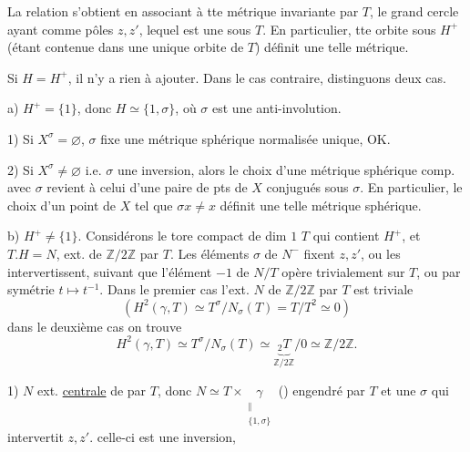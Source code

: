 La relation s'obtient en associant à tte métrique invariante par $T$, le  grand cercle ayant comme pôles $z,z'$, lequel est une  sous $T$. En particulier, tte orbite sous $H^+$ (étant contenue dans une unique orbite de $T$) définit une telle métrique.

Si $H=H^+$, il n'y a  rien à ajouter. Dans le
cas contraire, distinguons deux cas.

a) $H^+=\{1\}$, donc $H\simeq\{1,\sigma\}$, où $\sigma$ est une anti-involution.

1) Si \deleted{\unsure{$\sigma$}} $X^\sigma=\varnothing$, $\sigma$ fixe une métrique sphérique normalisée unique, OK.

2) Si $X^\sigma\ne\varnothing$ i.e. $\sigma$ une inversion, alors le choix d'une métrique sphérique comp. avec $\sigma$ revient à celui d'une paire de pts de $X$ conjugués sous $\sigma$. En particulier, le choix d'un point de $X$ tel que $\sigma x\ne x$ définit une telle métrique sphérique.

b) $H^+\ne\{1\}$. Considérons le tore  compact de dim $1$ $T$ qui contient $H^+$, et $T.H=N$, ext. de  $\mathbb Z/2\mathbb Z$ par $T$. Les éléments  $\sigma$ de $N^-$ fixent $z,z'$, ou les intervertissent, suivant que l'élément $-1$ de $N/T$ opère trivialement sur $T$, ou par symétrie $t\longmapsto t^{-1}$.
Dans le premier cas l'ext. $N$ de\inserted{$\gamma=$} $\mathbb Z/2\mathbb Z$ par $T$ est triviale
\[
\left(H^2(\gamma,T)\simeq T^\sigma/N_\sigma(T)=T/T^2\simeq0\right)
\]
dans le deuxième cas on trouve
\[
H^2(\gamma,T)\simeq T^\sigma/N_\sigma(T)\simeq\underbrace{{}_2T}_{\mathbb Z/2\mathbb Z}/0\simeq\mathbb Z/2\mathbb Z.
\]

1) $N$ ext. \uline{centrale} de \inserted{$\gamma$} par $T$, donc $N\simeq T\times\underset{\substack{\Vert\\\{1,\sigma\}}}{\gamma}$ () engendré par $T$ et une $\sigma$  qui  intervertit $z,z'$.   celle-ci est une inversion, 

